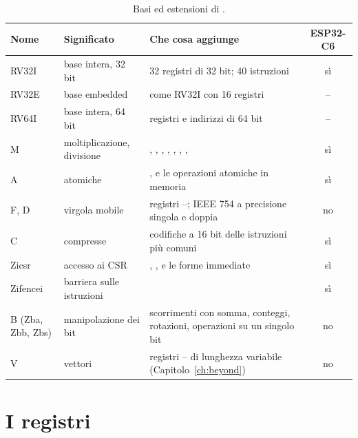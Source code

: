 \begin{table}[htb]
\centering\small
\caption{Basi ed estensioni di \riscv.}\label{tab:rv:ext}
\begin{tabularx}{\textwidth}{@{}llLc@{}}
\toprule
\textbf{Nome} & \textbf{Significato} & \textbf{Che cosa aggiunge} & \textbf{ESP32-C6}\\
\midrule
RV32I & base intera, 32 bit & 32 registri di 32 bit; 40 istruzioni & sì\\
RV32E & base embedded & come RV32I con 16 registri & --\\
RV64I & base intera, 64 bit & registri e indirizzi di 64 bit & --\\
M & moltiplicazione, divisione & , , , , , , ,  & sì\\
A & atomiche & ,  e le operazioni atomiche in memoria & sì\\
F, D & virgola mobile & registri --; IEEE 754 a precisione singola e doppia & no\\
C & compresse & codifiche a 16 bit delle istruzioni più comuni & sì\\
Zicsr & accesso ai CSR & , ,  e le forme immediate & sì\\
Zifencei & barriera sulle istruzioni &  & sì\\
B (Zba, Zbb, Zbs) & manipolazione dei bit & scorrimenti con somma, conteggi, rotazioni, operazioni su un singolo bit & no\\
V & vettori & registri -- di lunghezza variabile (Capitolo~\ref{ch:beyond}) & no\\
\bottomrule
\end{tabularx}
\end{table}

\section{I registri}

